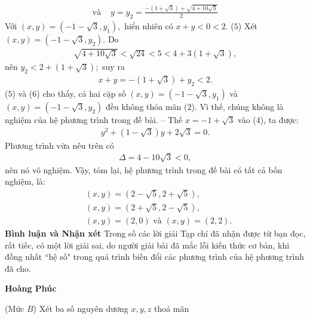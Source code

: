 \begin{multicols}{2}
\begin{align*}
		\text{và } &y = {y_2} = \frac{{ - \left( {1 + \sqrt 3 } \right) + \sqrt {4 + 10\sqrt 3 } }}{2}
	\end{align*}
	Với $\left( {x,y} \right) = \left( { - 1 - \sqrt 3 ,{y_1}} \right),$  hiển nhiên có $x + y < 0 < 2$. \hfill ($5$)
	\vskip 0.05cm
	Xét $\left( {x,y} \right) = \left( { - 1 - \sqrt 3 ,{y_2}} \right).$ Do
	\begin{align*}
		\sqrt {4 + 10\sqrt 3 }  < \sqrt {24}  < 5 < 4 + 3\left( {1 + \sqrt 3 } \right),
	\end{align*}
	nên  ${y_2} < 2 + \left( {1 + \sqrt 3 } \right);$ suy ra
	\begin{align*}
		x + y =  - \left( {1 + \sqrt 3 } \right) + {y_2} < 2. \tag{$6$}
	\end{align*}
	($5$) và ($6$) cho thấy, cả hai cặp số $\left( {x,y} \right) = \left( { - 1 - \sqrt 3 ,{y_1}} \right)$  và $\left( {x,y} \right) = \left( { - 1 - \sqrt 3 ,{y_2}} \right)$  đều không thỏa mãn ($2$). Vì thế, chúng không là nghiệm của hệ phương trình trong đề bài.
	\vskip 0.05cm
	-- Thế  $x =  - 1 + \sqrt 3 $ vào ($4$), ta được:
	\begin{align*}
		{y^2} + \left( {1 - \sqrt 3 } \right)y + 2\sqrt 3  = 0.
	\end{align*}
	Phương trình vừa nêu trên có
	\begin{align*}
		\Delta  = 4 - 10\sqrt 3  < 0,
	\end{align*}
	nên nó vô nghiệm.
	\vskip 0.05cm
	Vậy, tóm lại, hệ phương trình trong đề bài có tất cả bốn nghiệm, là:
	\begin{align*}
		&\left( {x,y} \right) = \left( {2 - \sqrt 5 ,2 + \sqrt 5 } \right),\\
		&\left( {x,y} \right) = \left( {2 + \sqrt 5 ,2 - \sqrt 5 } \right),\\
		&\left( {x,y} \right) = \left( {2,0} \right) \text{ và } \left( {x,y} \right) = \left( {2,2} \right).
	\end{align*}
	\textbf{\color{thachthuctoanhoc}Bình luận và Nhận xét}
	\vskip 0.05cm
	Trong số các lời giải Tạp chí đã nhận được từ bạn đọc, rất tiếc, có một lời giải sai, do người giải bài đã mắc lỗi kiến thức cơ bản, khi đồng nhất ``hệ số" trong quá trình biến đổi các phương trình của hệ phương trình đã cho.
	\begin{flushright}
		\textbf{\color{thachthuctoanhoc}Hoàng Phúc}
	\end{flushright}
	{}
	(Mức $B$) Xét ba số nguyên dương $x,y,z$ thoả mãn
	\begin{align*}

\end{align*}
\end{multicols}
